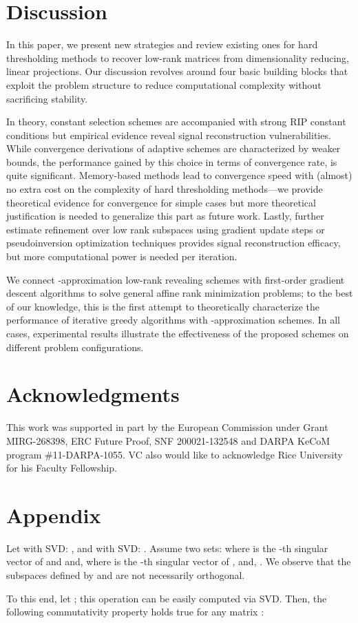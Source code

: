 \documentclass[twocolumn]{svjour3}
\begin{document}
\section{Discussion}{\label{sec: conc}}

In this paper, we present new strategies and review existing ones for hard thresholding methods to recover low-rank matrices from dimensionality reducing, linear projections. Our discussion revolves around four basic building blocks that exploit the problem structure to reduce computational complexity without sacrificing stability.  

In theory, constant  selection schemes are accompanied with strong RIP constant conditions but empirical evidence reveal signal reconstruction vulnerabilities. While convergence derivations of adaptive schemes are characterized by weaker bounds, the performance gained by this choice in terms of convergence rate, is quite significant. Memory-based methods lead to convergence speed with (almost) no extra cost on the complexity of hard thresholding methods---we provide theoretical evidence for convergence for simple cases but more theoretical justification is needed to generalize this part as future work. Lastly, further estimate refinement over low rank subspaces using gradient update steps or pseudoinversion optimization techniques provides signal reconstruction efficacy, but more computational power is needed per iteration. 

We connect -approximation low-rank revealing schemes with first-order gradient descent algorithms to solve general affine rank minimization problems; to the best of our knowledge, this is the first attempt to theoretically characterize the performance of iterative greedy algorithms with -approximation schemes. In all cases, experimental results illustrate the effectiveness of the proposed schemes on different problem configurations.

\section*{Acknowledgments}
This work was supported in part by the European Commission under Grant MIRG-268398, ERC Future Proof, SNF 200021-132548 and DARPA KeCoM program \#11-DARPA-1055. VC also would like to acknowledge Rice University for his Faculty Fellowship.

\appendix

\section{Appendix}
\begin{remark}
Let  with SVD: , and  with SVD: . Assume two sets:    where  is the -th singular vector of  and   and,    where  is the -th singular vector of ,  and, . We observe that the subspaces defined by  and  are not necessarily orthogonal. 

To this end, let ; this operation can be easily computed via SVD. Then, the following commutativity property holds true for any matrix :
 
\end{remark}
\end{document}
